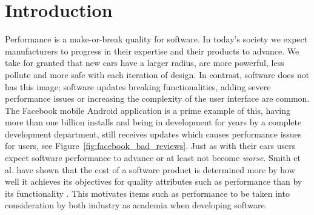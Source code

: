 \chapter{Introduction}
\label{chp:introduction}





% 

Performance is a make-or-break quality for software.
In today's society we expect manufacturers to progress in their expertise and their products to advance.
We take for granted that new cars have a larger radius, are more powerful, less pollute and more safe with each iteration of design.
In contrast, software does not has this image; software updates breaking functionalities, adding severe performance issues or increasing the complexity of the user interface are common.
The Facebook mobile Android application is a prime example of this, having more than one billion installs and being in development for years by a complete development department, still receives updates which causes performance issues for users, see Figure~\ref{fig:facebook_bad_reviews}.
Just as with their cars users expect software performance to advance or at least not become \emph{worse}. 
Smith et al. have shown that the cost of a software product is determined more by how well it achieves its objectives for quality attributes such as performance than by its functionality \cite{smith2003software}.
This motivates items such as performance to be taken into consideration by both industry as academia when developing software.

